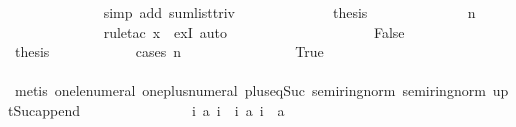 \begin{isabellebody}
\ \ \ \ \ \ \ \ \ \ \ \ \isamarkupfalse%
\ {\isacharparenleft}simp\ add{\isacharcolon}\ sum{\isacharunderscore}list{\isacharunderscore}triv{\isacharparenright}\isanewline
\ \ \ \ \ \ \ \ \ \ \isamarkupfalse%
\ \isamarkupfalse%
\ {\isacharquery}thesis\isanewline
\ \ \ \ \ \ \ \ \ \ \ \ \isamarkupfalse%
\ {\isacharbackquoteopen}n\ {\isacharequal}\ {}{}{}{}{\isacharbackquoteclose}\isanewline
\ \ \ \ \ \ \ \ \ \ \ \ \isamarkupfalse%
\ {\isacharparenleft}rule{\isacharunderscore}tac\ x{\isacharequal}{\isachardoublequoteopen}{}{}{}{}{\isachardoublequoteclose}\ \ exI{\isacharcomma}\ auto{\isacharparenright}\isanewline
\ \ \ \ \ \ \ \ \isamarkupfalse%
\isanewline
\ \ \ \ \ \ \ \ \ \ \isamarkupfalse%
\ False\isanewline
\ \ \ \ \ \ \ \ \ \ \isamarkupfalse%
\ {\isacharquery}thesis\isanewline
\ \ \ \ \ \ \ \ \ \ \isamarkupfalse%
\ {\isacharparenleft}cases\ {\isachardoublequoteopen}n\ {\isacharequal}\ {}{}{}{}{\isachardoublequoteclose}{\isacharparenright}\isanewline
\ \ \ \ \ \ \ \ \ \ \ \ \isamarkupfalse%
\ True\isanewline
\ \ \ \ \ \ \ \ \ \ \ \ \isamarkupfalse%
\ {\isachardoublequoteopen}{\isacharbrackleft}{}{\isachardot}{\isachardot}{\isacharless}{}{}{}{}{\isacharbrackright}\ {\isacharequal}\ {\isacharbrackleft}{}{\isachardot}{\isachardot}{\isacharless}{}{}{}{}{\isacharbrackright}\ {\isacharat}\ {\isacharbrackleft}{}{}{}{}{\isacharbrackright}{\isachardoublequoteclose}\isanewline
\ \ \ \ \ \ \ \ \ \ \ \ \ \ \isamarkupfalse%
\ {\isacharparenleft}metis\ one{\isacharunderscore}le{\isacharunderscore}numeral\ one{\isacharunderscore}plus{\isacharunderscore}numeral\ plus{\isacharunderscore}{}{\isacharunderscore}eq{\isacharunderscore}Suc\ semiring{\isacharunderscore}norm{\isacharparenleft}{}{\isacharparenright}\ semiring{\isacharunderscore}norm{\isacharparenleft}{}{\isacharparenright}\ upt{\isacharunderscore}Suc{\isacharunderscore}append{\isacharparenright}\isanewline
\ \ \ \ \ \ \ \ \ \ \ \ \isamarkupfalse%
\ \isamarkupfalse%
\ {\isachardoublequoteopen}{\isacharparenleft}{\isasymSum}i{\isasymleftarrow}{\isacharbrackleft}{}{\isachardot}{\isachardot}{\isacharless}{}{}{}{}{\isacharbrackright}{\isachardot}\ {\isacharquery}a\ i{\isacharparenright}\ {\isacharequal}\ {\isacharparenleft}{\isasymSum}i{\isasymleftarrow}{\isacharbrackleft}{}{\isachardot}{\isachardot}{\isacharless}{}{}{}{}{\isacharbrackright}{\isachardot}\ {\isacharquery}a\ i{\isacharparenright}\ {\isacharplus}\ {\isacharquery}a\ {}{}{}{}{\isachardoublequoteclose}\isanewline

\end{isabellebody}
